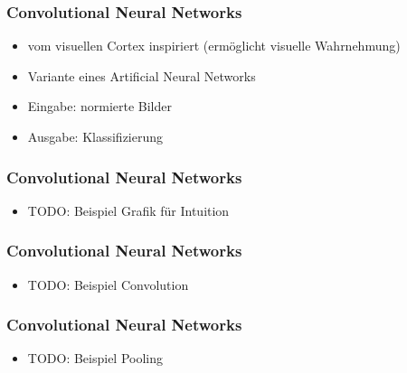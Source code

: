 \documentclass[12pt,utf8]{beamer}
\begin{document}
	\begin{frame}
		\frametitle{Convolutional Neural Networks}
		\begin{itemize}
			\item vom visuellen Cortex inspiriert (ermöglicht visuelle Wahrnehmung)
			\item Variante eines Artificial Neural Networks
			\item Eingabe: normierte Bilder
			\item Ausgabe: Klassifizierung
		\end{itemize}
	\end{frame}
	
	\begin{frame}
		\frametitle{Convolutional Neural Networks}
		\begin{itemize}
			\item TODO: Beispiel Grafik für Intuition
		\end{itemize}
	\end{frame}
	
	\begin{frame}
		\frametitle{Convolutional Neural Networks}
		\begin{itemize}
			\item TODO: Beispiel Convolution
		\end{itemize}
	\end{frame}
	
	\begin{frame}
		\frametitle{Convolutional Neural Networks}
		\begin{itemize}
			\item TODO: Beispiel Pooling
		\end{itemize}
	\end{frame}
	
	\begin{frame}
		
		
	\end{frame}
\end{document}
